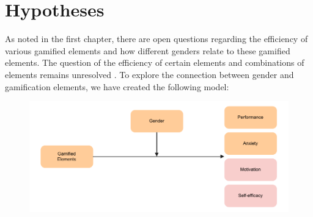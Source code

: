 \section{Hypotheses}

As noted in the first chapter, there are open questions regarding the efficiency of various gamified elements and how different genders relate to these gamified elements.
The question of the efficiency of certain elements and combinations of elements remains unresolved \parencite{dehghanzadehUsingGamificationSupport2024}.
To explore the connection between gender and gamification elements, we have created the following model:\newline

%
%
%
%
\begin{figure}[H]
    \centering
    \includegraphics{img/Hypotheses}
    \label{fig:figureHypotheses}
\end{figure}
